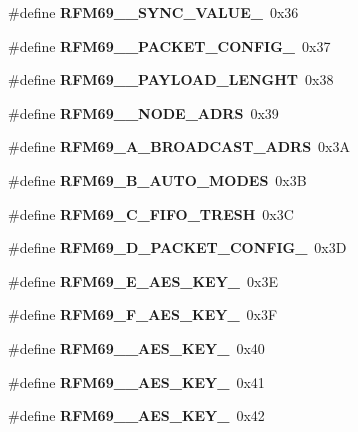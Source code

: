 \begin{DoxyCompactItemize}
\item 
\mbox{\label{_r_f_m69__registri_8h_aa8cbcd723ef32f36637af54411b5ce8b}} 
\#define {\bfseries R\+F\+M69\+\_\+\_\+\+S\+Y\+N\+C\+\_\+\+V\+A\+L\+U\+E\+\_}~0x36
\item 
\mbox{\label{_r_f_m69__registri_8h_ae9e1d7ff94a6b29d75c87c7cf939dd8a}} 
\#define {\bfseries R\+F\+M69\+\_\+\_\+\+P\+A\+C\+K\+E\+T\+\_\+\+C\+O\+N\+F\+I\+G\+\_}~0x37
\item 
\mbox{\label{_r_f_m69__registri_8h_a593d815e8b616444cb8a8d2e5979d31a}} 
\#define {\bfseries R\+F\+M69\+\_\+\_\+\+P\+A\+Y\+L\+O\+A\+D\+\_\+\+L\+E\+N\+G\+HT}~0x38
\item 
\mbox{\label{_r_f_m69__registri_8h_a5a8ffd2022ba8923a9f725f272a5b57d}} 
\#define {\bfseries R\+F\+M69\+\_\+\_\+\+N\+O\+D\+E\+\_\+\+A\+D\+RS}~0x39
\item 
\mbox{\label{_r_f_m69__registri_8h_ad0fb760c343473d60b21d8e35b81fd74}} 
\#define {\bfseries R\+F\+M69\+\_\+A\+\_\+\+B\+R\+O\+A\+D\+C\+A\+S\+T\+\_\+\+A\+D\+RS}~0x3A
\item 
\mbox{\label{_r_f_m69__registri_8h_a3bfd1096435209cd9a63ad146a59729b}} 
\#define {\bfseries R\+F\+M69\+\_\+B\+\_\+\+A\+U\+T\+O\+\_\+\+M\+O\+D\+ES}~0x3B
\item 
\mbox{\label{_r_f_m69__registri_8h_aef824a8409bffb487a9b47af116934ed}} 
\#define {\bfseries R\+F\+M69\+\_\+C\+\_\+\+F\+I\+F\+O\+\_\+\+T\+R\+E\+SH}~0x3C
\item 
\mbox{\label{_r_f_m69__registri_8h_a753206492841c642b99821c33641b4f4}} 
\#define {\bfseries R\+F\+M69\+\_\+D\+\_\+\+P\+A\+C\+K\+E\+T\+\_\+\+C\+O\+N\+F\+I\+G\+\_}~0x3D
\item 
\mbox{\label{_r_f_m69__registri_8h_a4caac8e71fea8425de3916972a6c3578}} 
\#define {\bfseries R\+F\+M69\+\_\+E\+\_\+\+A\+E\+S\+\_\+\+K\+E\+Y\+\_}~0x3E
\item 
\mbox{\label{_r_f_m69__registri_8h_aac05894cf669b5540e7c44da801b5bdd}} 
\#define {\bfseries R\+F\+M69\+\_\+F\+\_\+\+A\+E\+S\+\_\+\+K\+E\+Y\+\_}~0x3F
\item 
\mbox{\label{_r_f_m69__registri_8h_aa7967722e2d0223b2536e62bd857848d}} 
\#define {\bfseries R\+F\+M69\+\_\+\_\+\+A\+E\+S\+\_\+\+K\+E\+Y\+\_}~0x40
\item 
\mbox{\label{_r_f_m69__registri_8h_ac67e00dcc1e1d28f3ac80554d67bb528}} 
\#define {\bfseries R\+F\+M69\+\_\+\_\+\+A\+E\+S\+\_\+\+K\+E\+Y\+\_}~0x41
\item 
\mbox{\label{_r_f_m69__registri_8h_a02d8eb5fb11191ae8e7a20bfd100420e}} 
\#define {\bfseries R\+F\+M69\+\_\+\_\+\+A\+E\+S\+\_\+\+K\+E\+Y\+\_}~0x42

\end{DoxyCompactItemize}
